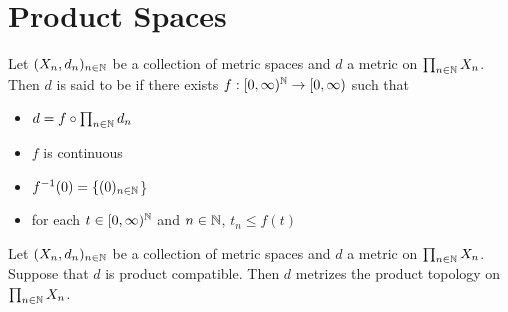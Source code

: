 \documentclass{book}
\begin{document}
\newpage
\section{Product Spaces}

\begin{defn}
	Let $(X_n, d_n)_{n \in \mathbb{N}}$ be a collection of metric spaces and $d$ a metric on $\prod_{n \in \mathbb{N}} X_n $. Then $d$ is said to be  if there exists $f: [0,\infty)^{\mathbb{N}} \rightarrow [0,\infty)$ such that 
	\begin{itemize}
		\item $d = f \circ \prod_{n \in \mathbb{N}} d_n$
		\item $f$ is continuous
		\item $f^{-1}(0) = \{(0)_{n \in \mathbb{N}}$\}
		\item for each $t \in [0,\infty)^{\mathbb{N}}$ and $n \in \mathbb{N}$, $t_n \leq f(t)$
	\end{itemize}
\end{defn}

\begin{ex}
	Let $(X_n, d_n)_{n \in \mathbb{N}}$ be a collection of metric spaces and $d$ a metric on $\prod_{n \in \mathbb{N}} X_n$. Suppose that $d$ is product compatible. Then $d$ metrizes the product topology on $\prod_{n \in \mathbb{N}} X_n$.
\end{ex}
\end{document}
